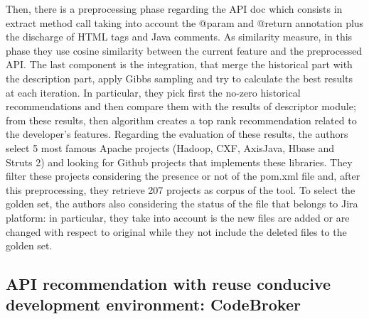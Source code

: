 Then, there is a preprocessing phase regarding the API doc which consists in extract method call taking into account the @param and @return annotation plus the discharge of HTML tags and Java comments. As similarity measure, in this phase they use cosine similarity between the current feature and the preprocessed API. The last component is the integration, that merge the historical part with the description part, apply Gibbs sampling and try to calculate the best results at each iteration. In particular, they pick first the no-zero historical recommendations and then compare them with the results of descriptor module; from these results, then algorithm creates a top rank recommendation related to the developer's features. Regarding the evaluation of these results, the authors select 5 most famous Apache projects (Hadoop, CXF, AxisJava, Hbase and Struts 2) and looking for Github projects that implements these libraries. They filter these projects considering the presence or not of the pom.xml file and, after this preprocessing, they retrieve 207 projects as corpus of the tool. To select the golden set, the authors also considering the status of the file that belongs to Jira platform: in particular, they take into account is the new files are added or are changed with respect to original while they not include the deleted files to the golden set.


\subsection{API recommendation with reuse conducive development environment: CodeBroker}

